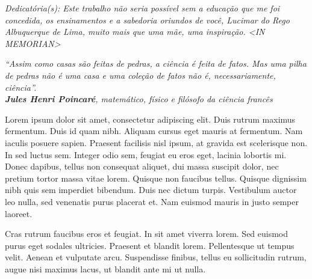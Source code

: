 \cleardoublepage
\thispagestyle{empty}
\vspace*{200mm}

\begin{flushright}
{\em 
Dedicat\'oria(s): Este trabalho não seria possível sem a educação que me foi concedida, os ensinamentos e a sabedoria oriundos de você, Lucimar do Rego Albuquerque de Lima, muito mais que uma mãe, uma inspiração. <IN MEMORIAN>
}
\end{flushright}
\newpage


\cleardoublepage
\thispagestyle{empty}
\vspace*{200mm}

\begin{flushright}
	{\em 
		“Assim como casas são feitas de pedras, a ciência é feita de fatos. Mas uma pilha de pedras não é uma casa e uma coleção de fatos não é, necessariamente, ciência”.  \\ \textbf{Jules Henri Poincaré}, matemático, físico e filósofo da ciência francês
	}
\end{flushright}
\newpage




\hspace{5mm}
Lorem ipsum dolor sit amet, consectetur adipiscing elit. Duis rutrum maximus fermentum. Duis id quam nibh. Aliquam cursus eget mauris at fermentum. Nam iaculis posuere sapien. Praesent facilisis nisl ipsum, at gravida est scelerisque non. In sed luctus sem. Integer odio sem, feugiat eu eros eget, lacinia lobortis mi. Donec dapibus, tellus non consequat aliquet, dui massa suscipit dolor, nec pretium tortor massa vitae lorem. Quisque non faucibus tellus. Quisque dignissim nibh quis sem imperdiet bibendum. Duis nec dictum turpis. Vestibulum auctor leo nulla, sed venenatis purus placerat et. Nam euismod mauris in justo semper laoreet.

Cras rutrum faucibus eros et feugiat. In sit amet viverra lorem. Sed euismod purus eget sodales ultricies. Praesent et blandit lorem. Pellentesque ut tempus velit. Aenean et vulputate arcu. Suspendisse finibus, tellus eu sollicitudin rutrum, augue nisi maximus lacus, ut blandit ante mi ut nulla.

